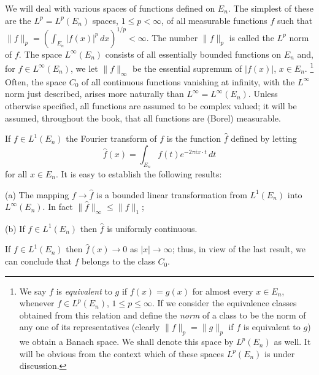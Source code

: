We will deal with various spaces of functions defined on $E_{n}$. The simplest
of these are the $L^{p} = L^{p}(E_{n})$ spaces, $1 \leq p < \infty$, of all
measurable functions $f$ such that
$\|f\|_{p} = (\int_{E_{n}} |f(x)|^{p} \, dx)^{1/p} < \infty$. The number
$\|f\|_{p}$ is called the $L^{p}$ norm of $f$. The space $L^{\infty}(E_{n})$
consists of all essentially bounded functions on $E_{n}$ and, for
$f \in L^{\infty}(E_{n})$, we let $\|f\|_{\infty}$ be the essential supremum of
$|f(x)|$, $x \in E_{n}$.%
\footnote{We say $f$ is \textit{equivalent} to $g$ if $f(x) = g(x)$ for almost every
$x \in E_{n}$, whenever $f \in L^{p}(E_{n})$, $1 \leq p \leq \infty$. If we
consider the equivalence classes obtained from this relation and define the
\textit{norm} of a class to be the norm of any one of its representatives (clearly
$\|f\|_{p} = \|g\|_{p}$ if $f$ is equivalent to $g$) we obtain a Banach space.
We shall denote this space by $L^{p}(E_{n})$ as well. It will be obvious from
the context which of these spaces $L^{p}(E_{n})$ is under discussion.}
Often, the space $C_{0}$ of all continuous functions vanishing at infinity,
with the $L^{\infty}$ norm just described, arises more naturally than
$L^{\infty} = L^{\infty}(E_{n})$. Unless otherwise specified, all functions are
assumed to be complex valued; it will be assumed, throughout the book, that all
functions are (Borel) measurable.

If $f \in L^{1}(E_{n})$ the Fourier transform of $f$ is the function $\hat{f}$
defined by letting
\[
\hat{f}(x)=\int_{E_{n}}f(t)e^{-2\pi i x\cdot t}\,dt
\]
for all $x \in E_{n}$. It is easy to establish the following results:

\begin{theorem}\label{thm:c1-1-1}
\textup{(a)} The mapping $f \to \hat{f}$ is a bounded linear transformation
from $L^{1}(E_{n})$ into $L^{\infty}(E_{n})$. In fact
$\|\hat{f}\|_{\infty} \leq \|f\|_{1}$;

\textup{(b)} If $f \in L^{1}(E_{n})$ then $\hat{f}$ is uniformly continuous.
\end{theorem}

\begin{theorem}\label{thm:c1-1-2}
If $f \in L^{1}(E_{n})$ then $\hat{f}(x) \to 0$ as $|x| \to \infty$; thus, in
view of the last result, we can conclude that $\hat{f}$ belongs to the class
$C_{0}$.
\end{theorem}

